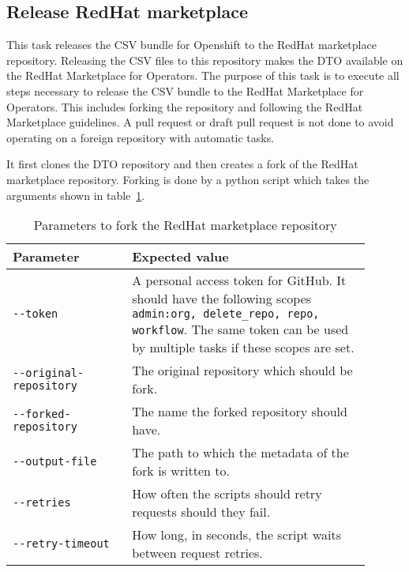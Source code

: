 \subsection{Release RedHat marketplace}\label{subsec:release-redhat-marketplace}

This task releases the CSV bundle for Openshift to the RedHat marketplace repository.
Releasing the CSV files to this repository makes the DTO available on the RedHat Marketplace for Operators.
The purpose of this task is to execute all steps necessary to release the CSV bundle to the RedHat Marketplace for Operators.
This includes forking the repository and following the RedHat Marketplace guidelines.
A pull request or draft pull request is not done to avoid operating on a foreign repository with automatic tasks.

It first clones the DTO repository and then creates a fork of the RedHat marketplace repository.
Forking is done by a python script which takes the arguments shown in table\ \ref{tab:parameters-to-fork-the-redhat-marketplace-repository}.

\begin{table}[H]
    \centering
    \caption{Parameters to fork the RedHat marketplace repository}
    \label{tab:parameters-to-fork-the-redhat-marketplace-repository}
    \begin{tabular}{p{0.3\linewidth}|p{0.6\linewidth}}
        Parameter & Expected value \\
        \hline
        \verb|--token| & A personal access token for GitHub.
            It should have the following scopes \verb|admin:org, delete_repo, repo, workflow|.
            The same token can be used by multiple tasks if these scopes are set. \\
        \verb|--original-repository| & The original repository which should be fork. \\
        \verb|--forked-repository| & The name the forked repository should have. \\
        \verb|--output-file| & The path to which the metadata of the fork is written to. \\
        \verb|--retries| & How often the scripts should retry requests should they fail. \\
        \verb|--retry-timeout| & How long, in seconds, the script waits between request retries. \\
    \end{tabular}
\end{table}

